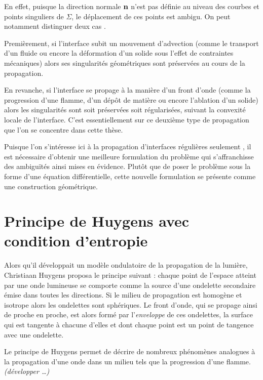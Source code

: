 En effet, puisque la direction normale $\mathbf{n}$ n'est pas définie au niveau des courbes et points singuliers de $\Sigma$, le déplacement de ces points est ambigu. 
On peut notamment distinguer deux cas \cite{jiao2007}.
\par
Premièrement, si l'interface subit un mouvement d'advection (comme le transport d'un fluide ou encore la déformation d'un solide sous l'effet de contraintes mécaniques) alors ses singularités géométriques sont préservées au cours de la propagation.
\par
En revanche, si l'interface se propage à la manière d'un front d'onde (comme la progression d'une flamme, d'un dépôt de matière ou encore l'ablation d'un solide) alors les singularités sont soit préservées soit régularisées, suivant la convexité locale de l'interface.
C'est essentiellement sur ce deuxième type de propagation que l'on se concentre dans cette thèse.
\par\bigskip
Puisque l'on s'intéresse ici à la propagation d'interfaces régulières seulement \piecewise, il est nécessaire d'obtenir une meilleure formulation du problème qui s'affranchisse des ambiguïtés ainsi mises en évidence. 
Plutôt que de poser le problème sous la forme d'une équation différentielle, cette nouvelle formulation se présente comme une construction géométrique.

\section{Principe de Huygens avec condition d'entropie}
\label{section:principe_huygens}
\def\p{\vit{p}}
\def\q{\vit{q}}
%
Alors qu'il développait un modèle ondulatoire de la propagation de la lumière, Christiaan Huygens proposa le principe suivant : chaque point de l'espace atteint par une onde lumineuse se comporte comme la source d'une ondelette secondaire émise dans toutes les directions. 
Si le milieu de propagation est homogène et isotrope alors les ondelettes sont sphériques. 
Le front d'onde, qui se propage ainsi de proche en proche, est alors formé par l'\textit{enveloppe} de ces ondelettes, \ie la surface qui est tangente à chacune d'elles et dont chaque point est un point de tangence avec une ondelette.
\par
Le principe de Huygens permet de décrire de nombreux phénomènes analogues à la propagation d'une onde dans un milieu tels que la progression d'une flamme. 
\textit{(développer \ldots)}

